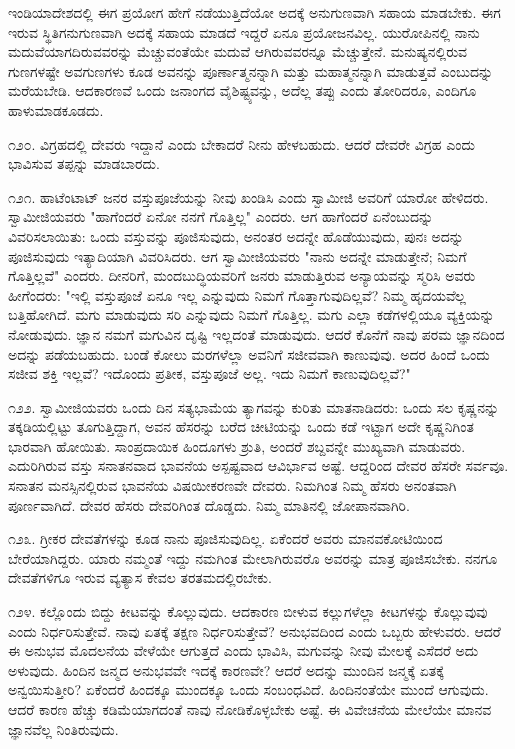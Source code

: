 ಇಂಡಿಯಾದೇಶದಲ್ಲಿ ಈಗ ಪ್ರಯೋಗ ಹೇಗೆ ನಡೆಯುತ್ತಿದೆಯೋ ಅದಕ್ಕೆ ಅನುಗುಣವಾಗಿ ಸಹಾಯ ಮಾಡಬೇಕು. ಈಗ ಇರುವ ಸ್ಥಿತಿಗನುಗುಣವಾಗಿ ಅದಕ್ಕೆ ಸಹಾಯ ಮಾಡದೆ ಇದ್ದರೆ ಏನೂ ಪ್ರಯೋಜನವಿಲ್ಲ. ಯುರೋಪಿನಲ್ಲಿ ನಾನು ಮದುವೆಯಾಗದಿರುವವರನ್ನು ಮೆಚ್ಚುವಂತೆಯೇ ಮದುವೆ ಆಗಿರುವವರನ್ನೂ ಮೆಚ್ಚುತ್ತೇನೆ. ಮನುಷ್ಯನಲ್ಲಿರುವ ಗುಣಗಳಷ್ಟೇ ಅವಗುಣಗಳು ಕೂಡ ಅವನನ್ನು ಪೂರ್ಣಾತ್ಮನನ್ನಾಗಿ ಮತ್ತು ಮಹಾತ್ಮನನ್ನಾಗಿ ಮಾಡುತ್ತವೆ ಎಂಬುದನ್ನು ಮರೆಯಬೇಡಿ. ಆದಕಾರಣವೆ ಒಂದು ಜನಾಂಗದ ವೈಶಿಷ್ಟ್ಯವನ್ನು, ಅದೆಲ್ಲ ತಪ್ಪು ಎಂದು ತೋರಿದರೂ, ಎಂದಿಗೂ ಹಾಳುಮಾಡಕೂಡದು.

೧೨೦. ವಿಗ್ರಹದಲ್ಲಿ ದೇವರು ಇದ್ದಾನೆ ಎಂದು ಬೇಕಾದರೆ ನೀನು ಹೇಳಬಹುದು. ಆದರೆ ದೇವರೇ ವಿಗ್ರಹ ಎಂದು ಭಾವಿಸುವ ತಪ್ಪನ್ನು ಮಾಡಬಾರದು.

೧೨೧. ಹಾಟೆಂಟಾಟ್ ಜನರ ವಸ್ತುಪೂಜೆಯನ್ನು ನೀವು ಖಂಡಿಸಿ ಎಂದು ಸ್ವಾಮೀಜಿ ಅವರಿಗೆ ಯಾರೋ ಹೇಳಿದರು. ಸ್ವಾಮೀಜಿಯವರು "ಹಾಗೆಂದರೆ ಏನೋ ನನಗೆ ಗೊತ್ತಿಲ್ಲ" ಎಂದರು. ಆಗ ಹಾಗೆಂದರೆ ಏನೆಂಬುದನ್ನು ವಿವರಿಸಲಾಯಿತು: ಒಂದು ವಸ್ತುವನ್ನು ಪೂಜಿಸುವುದು, ಅನಂತರ ಅದನ್ನೇ ಹೊಡೆಯುವುದು, ಪುನಃ ಅದನ್ನು ಪೂಜಿಸುವುದು ಇತ್ಯಾದಿಯಾಗಿ ವಿವರಿಸಿದರು. ಆಗ ಸ್ವಾಮೀಜಿಯವರು "ನಾನು ಅದನ್ನೇ ಮಾಡುತ್ತೇನೆ; ನಿಮಗೆ ಗೊತ್ತಿಲ್ಲವೆ" ಎಂದರು. ದೀನರಿಗೆ, ಮಂದಬುದ್ಧಿಯವರಿಗೆ ಜನರು ಮಾಡುತ್ತಿರುವ ಅನ್ಯಾಯವನ್ನು ಸ್ಮರಿಸಿ ಅವರು ಹೀಗೆಂದರು: "ಇಲ್ಲಿ ವಸ್ತುಪೂಜೆ ಏನೂ ಇಲ್ಲ ಎನ್ನುವುದು ನಿಮಗೆ ಗೊತ್ತಾಗುವುದಿಲ್ಲವೆ? ನಿಮ್ಮ ಹೃದಯವೆಲ್ಲ ಬತ್ತಿಹೋಗಿದೆ. ಮಗು ಮಾಡುವುದು ಸರಿ ಎನ್ನುವುದು ನಿಮಗೆ ಗೊತ್ತಿಲ್ಲ. ಮಗು ಎಲ್ಲಾ ಕಡೆಗಳಲ್ಲಿಯೂ ವ್ಯಕ್ತಿಯನ್ನು ನೋಡುವುದು. ಜ್ಞಾನ ನಮಗೆ ಮಗುವಿನ ದೃಷ್ಟಿ ಇಲ್ಲದಂತೆ ಮಾಡುವುದು. ಆದರೆ ಕೊನೆಗೆ ನಾವು ಪರಮ ಜ್ಞಾನದಿಂದ ಅದನ್ನು ಪಡೆಯಬಹುದು. ಬಂಡೆ ಕೋಲು ಮರಗಳೆಲ್ಲಾ ಅವನಿಗೆ ಸಜೀವವಾಗಿ ಕಾಣುವುವು. ಅದರ ಹಿಂದೆ ಒಂದು ಸಜೀವ ಶಕ್ತಿ ಇಲ್ಲವೆ? ಇದೊಂದು ಪ್ರತೀಕ, ವಸ್ತುಪೂಜೆ ಅಲ್ಲ. ಇದು ನಿಮಗೆ ಕಾಣುವುದಿಲ್ಲವೆ?"

೧೨೨. ಸ್ವಾಮೀಜಿಯವರು ಒಂದು ದಿನ ಸತ್ಯಭಾಮೆಯ ತ್ಯಾಗವನ್ನು ಕುರಿತು ಮಾತನಾಡಿದರು: ಒಂದು ಸಲ ಕೃಷ್ಣನನ್ನು ತಕ್ಕಡಿಯಲ್ಲಿಟ್ಟು ತೂಗುತ್ತಿದ್ದಾಗ, ಅವನ ಹೆಸರನ್ನು ಬರೆದ ಚೀಟಿಯನ್ನು ಒಂದು ಕಡೆ ಇಟ್ಟಾಗ ಅದೇ ಕೃಷ್ಣನಿಗಿಂತ ಭಾರವಾಗಿ ಹೋಯಿತು. ಸಾಂಪ್ರದಾಯಿಕ ಹಿಂದೂಗಳು ಶ್ರುತಿ, ಅಂದರೆ ಶಬ್ದವನ್ನೇ ಮುಖ್ಯವಾಗಿ ಮಾಡುವರು. ಎದುರಿಗಿರುವ ವಸ್ತು ಸನಾತನವಾದ ಭಾವನೆಯ ಅಸ್ಪಷ್ಟವಾದ ಆವಿರ್ಭಾವ ಅಷ್ಟೆ. ಆದ್ದರಿಂದ ದೇವರ ಹೆಸರೇ ಸರ್ವವೂ. ಸನಾತನ ಮನಸ್ಸಿನಲ್ಲಿರುವ ಭಾವನೆಯ ವಿಷಯೀಕರಣವೇ ದೇವರು. ನಿಮಗಿಂತ ನಿಮ್ಮ ಹೆಸರು ಅನಂತವಾಗಿ ಪೂರ್ಣವಾಗಿದೆ. ದೇವರ ಹೆಸರು ದೇವರಿಗಿಂತ ದೊಡ್ಡದು. ನಿಮ್ಮ ಮಾತಿನಲ್ಲಿ ಜೋಪಾನವಾಗಿರಿ.

೧೨೩. ಗ್ರೀಕರ ದೇವತೆಗಳನ್ನು ಕೂಡ ನಾನು ಪೂಜಿಸುವುದಿಲ್ಲ. ಏಕೆಂದರೆ ಅವರು ಮಾನವಕೋಟಿಯಿಂದ ಬೇರೆಯಾಗಿದ್ದರು. ಯಾರು ನಮ್ಮಂತೆ ಇದ್ದು ನಮಗಿಂತ ಮೇಲಾಗಿರುವರೊ ಅವರನ್ನು ಮಾತ್ರ ಪೂಜಿಸಬೇಕು. ನನಗೂ ದೇವತೆಗಳಿಗೂ ಇರುವ ವ್ಯತ್ಯಾಸ ಕೇವಲ ತರತಮದಲ್ಲಿರಬೇಕು.

೧೨೪. ಕಲ್ಲೊಂದು ಬಿದ್ದು ಕೀಟವನ್ನು ಕೊಲ್ಲುವುದು. ಆದಕಾರಣ ಬೀಳುವ ಕಲ್ಲುಗಳೆಲ್ಲಾ ಕೀಟಗಳನ್ನು ಕೊಲ್ಲುವುವು ಎಂದು ನಿರ್ಧರಿಸುತ್ತೇವೆ. ನಾವು ಏತಕ್ಕೆ ತಕ್ಷಣ ನಿರ್ಧರಿಸುತ್ತೇವೆ? ಅನುಭವದಿಂದ ಎಂದು ಒಬ್ಬರು ಹೇಳುವರು. ಆದರೆ ಈ ಅನುಭವ ಮೊದಲನೆಯ ವೇಳೆಯೇ ಆಗುತ್ತದೆ ಎಂದು ಭಾವಿಸಿ, ಮಗುವನ್ನು ನೀವು ಮೇಲಕ್ಕೆ ಎಸೆದರೆ ಅದು ಅಳುವುದು. ಹಿಂದಿನ ಜನ್ಮದ ಅನುಭವವೇ ಇದಕ್ಕೆ ಕಾರಣವೇ? ಆದರೆ ಅದನ್ನು ಮುಂದಿನ ಜನ್ಮಕ್ಕೆ ಏತಕ್ಕೆ ಅನ್ವಯಿಸುತ್ತೀರಿ? ಏಕೆಂದರೆ ಹಿಂದಕ್ಕೂ ಮುಂದಕ್ಕೂ ಒಂದು ಸಂಬಂಧವಿದೆ. ಹಿಂದಿನಂತೆಯೇ ಮುಂದೆ ಆಗುವುದು. ಆದರೆ ಕಾರಣ ಹೆಚ್ಚು ಕಡಿಮೆಯಾಗದಂತೆ ನಾವು ನೋಡಿಕೊಳ್ಳಬೇಕು ಅಷ್ಟೆ. ಈ ವಿವೇಚನೆಯ ಮೇಲೆಯೇ ಮಾನವ ಜ್ಞಾನವೆಲ್ಲ ನಿಂತಿರುವುದು.

